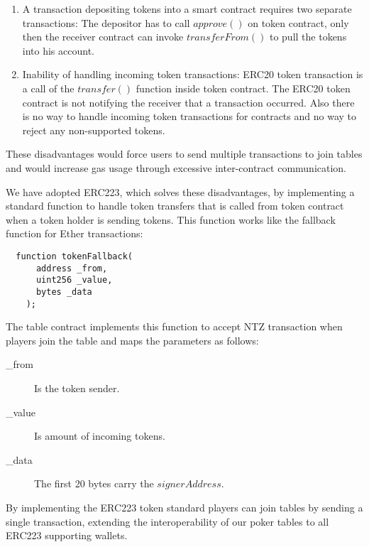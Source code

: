 \begin{enumerate}
\item A transaction depositing tokens into a smart contract requires two separate transactions: The depositor has to call \(approve()\) on token contract, only then the receiver contract can invoke \(transferFrom()\) to pull the tokens into his account.
\item Inability of handling incoming token transactions: ERC20 token transaction is a call of the \(transfer()\) function inside token contract. The ERC20 token contract is not notifying the receiver that a transaction occurred. Also there is no way to handle incoming token transactions for contracts and no way to reject any non-supported tokens.
\end{enumerate}

These disadvantages would force users to send multiple transactions to join tables and would increase gas usage through excessive inter-contract communication.

We have adopted ERC223, which solves these disadvantages, by implementing a standard function to handle token transfers that is called from token contract when a token holder is sending tokens. This function works like the fallback function for Ether transactions:

\begin{verbatim}
  function tokenFallback(
      address _from,
      uint256 _value,
      bytes _data
    );
\end{verbatim}

The table contract implements this function to accept NTZ transaction when players join the table and maps the parameters as follows:

\begin{description}
\item[\_from] Is the token sender.
\item[\_value] Is amount of incoming tokens.
\item[\_data] The first 20 bytes carry the \(signerAddress\).
\end{description}

By implementing the ERC223 token standard players can join tables by sending a single transaction, extending the interoperability of our poker tables to all ERC223 supporting wallets.


